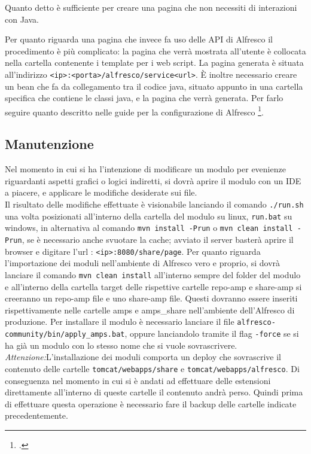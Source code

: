 Quanto detto è sufficiente per creare una pagina che non necessiti di interazioni con Java.

Per quanto riguarda una pagina che invece fa uso delle \gls{API} di Alfresco il procedimento è più complicato: la pagina che verrà mostrata all’utente è collocata nella cartella contenente i template per i web script.
La pagina generata è situata all’indirizzo \texttt{<ip>:<porta>/alfresco/service<url>}.
È inoltre necessario creare un bean che fa da collegamento tra il codice java, situato appunto in una cartella specifica che contiene le classi java, e la pagina che verrà generata. Per farlo seguire quanto descritto nelle guide per la configurazione di Alfresco \footcite{site:alfresco-bean}.

\subsection{Manutenzione}
Nel momento in cui si ha l'intenzione di modificare un modulo per evenienze riguardanti aspetti grafici o logici indiretti, si dovrà aprire il modulo con un IDE a piacere, e applicare le modifiche desiderate sui file.\\
 Il risultato delle modifiche effettuate è visionabile lanciando il comando \texttt{./run.sh} una volta posizionati all’interno della cartella del modulo su linux, \texttt{run.bat} su windows, in alternativa al comando \texttt{mvn install -Prun}  o  \texttt{mvn clean install -Prun}, se è necessario anche svuotare la cache; avviato il server basterà
aprire il browser e digitare l’url : \texttt{<ip>:8080/share/page}.
Per quanto riguarda l’importazione dei moduli nell'ambiente di Alfresco vero e proprio, si dovrà lanciare il comando \texttt{mvn clean install} all'interno sempre del folder del modulo e all’interno della cartella target delle rispettive cartelle repo-amp e share-amp si creeranno un repo-amp file e uno share-amp file. Questi dovranno essere inseriti rispettivamente nelle cartelle amps e amps\_share nell'ambiente dell'Alfresco di produzione.
Per installare il modulo  è necessario lanciare il file \texttt{alfresco-community/bin/apply\_amps.bat}, oppure lanciandolo tramite il flag \texttt{-force} se si ha già un modulo con lo stesso nome che si vuole sovrascrivere.\\
\emph{Attenzione:}L’installazione dei moduli comporta un deploy che sovrascrive il contenuto delle cartelle
\texttt{tomcat/webapps/share} e \texttt{tomcat/webapps/alfresco}. Di conseguenza nel momento in cui si è andati ad effettuare delle estensioni direttamente all’interno di queste cartelle il contenuto andrà perso. Quindi prima di effettuare questa operazione è necessario fare il backup delle cartelle indicate precedentemente.

